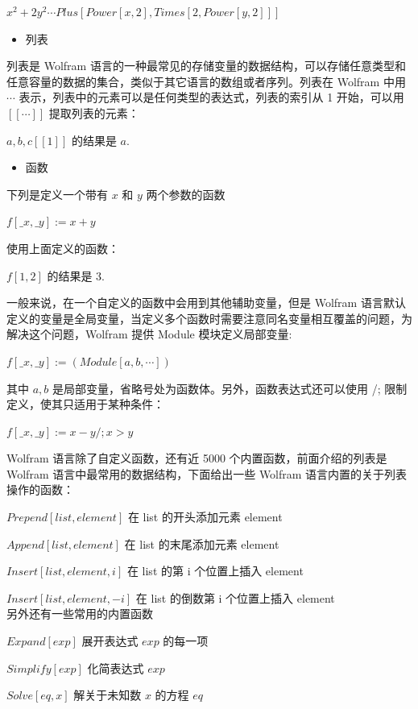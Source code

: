 $x^2+2y^2 \cdots Plus[Power[x,2],Times[2,Power[y,2]]]$

\begin{itemize}
\item 列表
\end{itemize}

列表是 Wolfram 语言的一种最常见的存储变量的数据结构，可以存储任意类型和任意容量的数据的集合，类似于其它语言的数组或者序列。列表在 Wolfram 中用 ${\cdots}$ 表示，列表中的元素可以是任何类型的表达式，列表的索引从 1 开始，可以用 $[[\cdots]]$ 提取列表的元素：

${a,b,c}[[1]]$ 的结果是 $a$.
\begin{itemize}
\item 函数
\end{itemize}

下列是定义一个带有 $x$ 和 $y$ 两个参数的函数

$f[\_x,\_y]:= x+y$

使用上面定义的函数：

$f[1,2]$ 的结果是 3.

一般来说，在一个自定义的函数中会用到其他辅助变量，但是 Wolfram 语言默认定义的变量是全局变量，当定义多个函数时需要注意同名变量相互覆盖的问题，为解决这个问题，Wolfram 提供 Module 模块定义局部变量:

$f[\_x,\_y]:=(Module[{a,b},\cdots])$

其中 $a,b$ 是局部变量，省略号处为函数体。另外，函数表达式还可以使用 /; 限制定义，使其只适用于某种条件：

$f[\_x,\_y]:= x-y/;x>y$

Wolfram 语言除了自定义函数，还有近 5000 个内置函数，前面介绍的列表是 Wolfram 语言中最常用的数据结构，下面给出一些 Wolfram 语言内置的关于列表操作的函数：

$Prepend[list,element]$	\quad 在 list 的开头添加元素 element

$Append[list,element]$	\quad 在 list 的末尾添加元素 element

$Insert[list,element,i]$ \quad	在 list 的第 i 个位置上插入 element

$Insert[list,element,-i]$ \quad	在 list 的倒数第 i 个位置上插入 element\\
另外还有一些常用的内置函数

$Expand[exp]$ \quad                       展开表达式 $exp$ 的每一项

$Simplify[exp]$  \quad                     化简表达式 $exp$

$Solve[eq,x]$  \quad           解关于未知数 $x$ 的方程 $eq$

